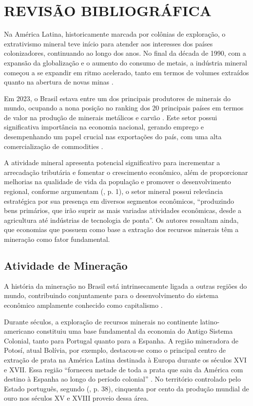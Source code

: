 \chapter{REVISÃO BIBLIOGRÁFICA}
\label{cap1Revisao}

Na América Latina, historicamente marcada por colônias de exploração, o extrativismo mineral teve início para atender aos interesses dos países colonizadores, continuando ao longo dos anos. No final da década de 1990, com a expansão da globalização e o aumento do consumo de metais, a indústria mineral começou a se expandir em ritmo acelerado, tanto em termos de volumes extraídos quanto na abertura de novas minas \cite{fernandes2016mineracao}.

Em 2023, o Brasil estava entre um dos principais produtores de minerais do mundo, ocupando a nona posição no ranking dos 20 principais países em termos de valor na produção de minerais metálicos e carvão \cite{wpr2024mineral}. Este setor possui significativa importância na economia nacional, gerando emprego e desempenhando um papel crucial nas exportações do país, com uma alta comercialização de commodities \cite{rbm2024mineracao}.

A atividade mineral apresenta potencial significativo para incrementar a arrecadação tributária e fomentar o crescimento econômico, além de proporcionar melhorias na qualidade de vida da população e promover o desenvolvimento regional, conforme argumentam \citeauthor{carvalho2012dependencia} (\citeyear{carvalho2012dependencia}, p. 1), o setor mineral possui relevância estratégica por sua presença em diversos segmentos econômicos, ``produzindo bens primários, que irão suprir as mais variadas atividades econômicas, desde a agricultura até indústrias de tecnologia de ponta''. Os autores ressaltam ainda, que
economias que possuem como base a extração dos recursos minerais têm a mineração como fator fundamental.

\section{Atividade de Mineração}
\label{sec:atividade_mineracao}

A história da mineração no Brasil está intrinsecamente ligada a outras regiões do mundo, contribuindo conjuntamente para o desenvolvimento do sistema econômico amplamente conhecido como capitalismo \cite[p. 5]{domingues2022historia}.

Durante séculos, a exploração de recursos minerais no continente latino-americano constituiu uma base fundamental da economia do Antigo Sistema Colonial, tanto para Portugal quanto para a Espanha. A região mineradora de Potosí, atual Bolívia, por exemplo, destacou-se como o principal centro de extração de prata na América Latina destinada à Europa durante os séculos XVI e XVII. Essa região ``forneceu metade de toda a prata que saiu da América com destino à Espanha ao longo do período colonial'' \cite[p. 122]{araoz2020mineracao}. No território controlado pelo Estado português, segundo \citeauthor{figueiroa1997ciencias} (\citeyear{figueiroa1997ciencias}, p. 38), cinquenta por cento da produção mundial de ouro nos séculos XV e XVIII proveio dessa área.

